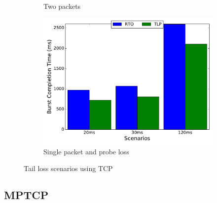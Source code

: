 \documentclass[10pt,conference]{IEEEtran}
\begin{document}
\begin{figure}[!tbp]
\begin{subfigure}[b]{0.32\textwidth}
	\caption{Two packets }\label{t2p}
 \end{subfigure}
 \hfill
 \begin{subfigure}[b]{0.32\textwidth}
	\includegraphics[angle=0, width=\textwidth, natwidth=578.16,natheight=433.62]{plots/T1PP.pdf}
	\caption{Single packet and probe loss }\label{t1pp}
 \end{subfigure}
 \caption{Tail loss scenarios using TCP}\label{tcpf}
\end{figure}
\subsection{MPTCP}
\end{document}
